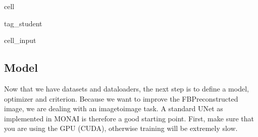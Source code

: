 \documentclass[letterpaper,10pt,english]{jupyterBook}
\begin{document}
\begin{sphinxuseclass}{cell}
\begin{sphinxuseclass}{tag_student}\begin{sphinxVerbatimInput}

\begin{sphinxuseclass}{cell_input}
\begin{sphinxVerbatim}[commandchars=\\\{\}]
  
  
\end{sphinxVerbatim}

\end{sphinxuseclass}\end{sphinxVerbatimInput}

\end{sphinxuseclass}
\end{sphinxuseclass}

\subsection{Model}
\label{\detokenize{notebooks/Tutorial5_Reconstruction/Tutorial5_Reconstruction_student:model}}
\sphinxAtStartPar
Now that we have datasets and dataloaders, the next step is to define a model, optimizer and criterion. Because we want to improve the FBP\sphinxhyphen{}reconstructed image, we are dealing with an image\sphinxhyphen{}to\sphinxhyphen{}image task. A standard U\sphinxhyphen{}Net as implemented in MONAI is therefore a good starting point. First, make sure that you are using the GPU (CUDA), otherwise training will be extremely slow.
\end{document}
